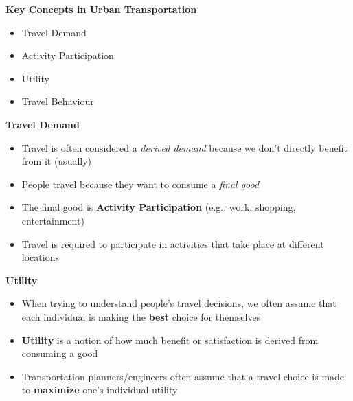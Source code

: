 \documentclass[aspectratio=169]{beamer}
\begin{document}




\begin{frame}
	\LARGE{\textbf{Key Concepts in Urban Transportation}}
	\normalsize
	\vspace{4mm}
	\begin{itemize}
		\item Travel Demand
		\item Activity Participation
		\item Utility
		\item Travel Behaviour
	\end{itemize}
\end{frame}




\begin{frame}
	
	\textbf{Travel Demand}
	\vspace{4mm}
	
	\begin{itemize}
		\item Travel is often considered a \textit{derived demand} because we don’t directly benefit from it (usually)
		
		\item People travel because they want to consume a \textit{final good}
		
		\item The final good is \textbf{Activity Participation} (e.g., work, shopping, entertainment)
		 
		\item Travel is required to participate in activities that take place at different locations
	\end{itemize}
	
\end{frame}





\begin{frame}
	
	\textbf{Utility}
	\vspace{4mm}
	
	\begin{itemize}
		\item When trying to understand people’s travel decisions, we often assume that each individual is making the \textbf{best} choice for themselves
		
		\item \textbf{Utility} is a notion of how much benefit or satisfaction is derived from consuming a good
		
		\item Transportation planners/engineers often assume that a travel choice is made to \textbf{maximize} one’s individual utility
	\end{itemize}
	
	
\end{frame}
\end{document}
